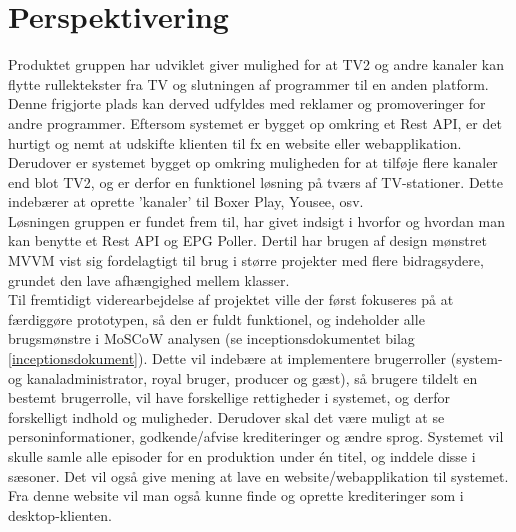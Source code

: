 \section{Perspektivering}

Produktet gruppen har udviklet giver mulighed for at TV2 og andre kanaler kan flytte rullektekster fra TV og slutningen af programmer til en anden platform. Denne frigjorte plads kan derved udfyldes med reklamer og promoveringer for andre programmer. Eftersom systemet er bygget op omkring et Rest API, er det hurtigt og nemt at udskifte klienten til fx en website eller webapplikation. Derudover er systemet bygget op omkring muligheden for at tilføje flere kanaler end blot TV2, og er derfor en funktionel løsning på tværs af TV-stationer. Dette indebærer at oprette 'kanaler' til Boxer Play, Yousee, osv.\\
Løsningen gruppen er fundet frem til, har givet indsigt i hvorfor og hvordan man kan benytte et Rest API og EPG Poller. Dertil har brugen af design mønstret MVVM vist sig fordelagtigt til brug i større projekter med flere bidragsydere, grundet den lave afhængighed mellem klasser. \\

Til fremtidigt viderearbejdelse af projektet ville der først fokuseres på at færdiggøre prototypen, så den er fuldt funktionel, og indeholder alle brugsmønstre i MoSCoW analysen (se inceptionsdokumentet bilag \ref{inceptionsdokument}). Dette vil indebære at implementere brugerroller (system- og kanaladministrator, royal bruger, producer og gæst), så brugere tildelt en bestemt brugerrolle, vil have forskellige rettigheder i systemet, og derfor forskelligt indhold og muligheder. Derudover skal det være muligt at se personinformationer, godkende/afvise krediteringer og ændre sprog.
Systemet vil skulle samle alle episoder for en produktion under én titel, og inddele disse i sæsoner.
Det vil også give mening at lave en website/webapplikation til systemet. Fra denne website vil man også kunne finde og oprette krediteringer som i desktop-klienten. \\


